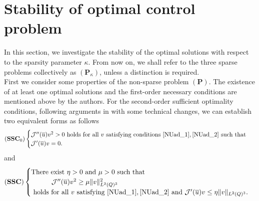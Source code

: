 \documentclass[reqno]{amsart}
\begin{document}
	
	\section{Stability of optimal control problem}
	In this section, we investigate the stability of the optimal solutions with respect to the sparsity parameter $\kappa$. From now on, we shall refer to the three sparse problems collectively as $(\textbf{P}_\kappa)$, unless a distinction is required. \\
	First we consider some properties of the non-sparse problem $(\textbf{P})$. The existence of at least one optimal solutions and the first-order necessary conditions are mentioned above by the authors. For the second-order sufficient optimality conditions, following arguments in \cite{AS2025} with some technical changes, we can establish two equivalent forms as follows
	\begin{equation*}
		(\textbf{SSC}_0)
		\begin{cases}
			\mathcal{J}''(\overline{u})v^2 > 0 \text{ holds for all }v \text{ satisfying conditions} \ \eqref{NUad_1}, \eqref{NUad_2} \ \text{such that } \\
			\mathcal{J}'(\overline{u})v=0.
		\end{cases}
	\end{equation*} 
	and
	\begin{align*}
		(\textbf{SSC})\begin{cases}
			\text{There exist $\eta>0$ and $\mu>0$ such that}\\
			\hspace{30pt} \mathcal{J}''(\overline{u})v^2 \geq \mu \| v \|^2_{L^2(Q)^3}\\
			\text { holds for all } v \ \text{satisfying} \ \eqref{NUad_1}, \eqref{NUad_2}
			\text{ and $\mathcal{J}'(\overline{u})v \leq \eta \|v\|_{L^2(Q)^3}$.}
		\end{cases}
	\end{align*}
	
\end{document}
